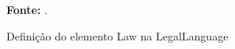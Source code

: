 \begin{figure}[ht!]
\centering

\caption{\textmd{Definição do elemento Law na LegalLanguage}}
\label{fig:xtextlegal}

\par\medskip\textbf{Fonte:} . \par\medskip

\end{figure}


